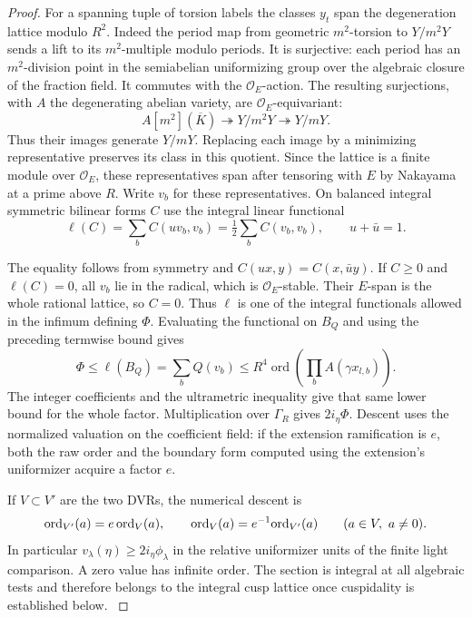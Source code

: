 \begin{proof}
For a spanning tuple of torsion labels the classes \(y_t\) span the
degeneration lattice modulo \(R^2\). Indeed the period map from
geometric \(m^2\)-torsion to \(Y/m^2Y\) sends a lift to its
\(m^2\)-multiple modulo periods. It is surjective: each period
has an \(m^2\)-division point in the semiabelian uniformizing
group over the algebraic closure of the fraction field. It
commutes with the \(\mathcal O_E\)-action. The resulting surjections, with \(A\) the degenerating abelian
variety, are \(\mathcal O_E\)-equivariant:
\[
 A[m^2](\overline K)\twoheadrightarrow Y/m^2Y\twoheadrightarrow Y/mY .
\]
Thus their images generate \(Y/mY\). Replacing each image by a minimizing
representative preserves its class in this quotient. Since the lattice is a finite module over
\(\mathcal O_E\), these representatives span after tensoring
with \(E\) by Nakayama at a prime above \(R\).
Write \(v_b\) for these representatives. On balanced integral
symmetric bilinear forms \(C\) use the integral linear functional
\[
 \ell(C)=\sum_b C(uv_b,v_b)
        =\tfrac12\sum_b C(v_b,v_b),\qquad u+\bar u=1 .
\]

The equality follows from symmetry and
\(C(ux,y)=C(x,\bar u y)\). If \(C\ge0\) and \(\ell(C)=0\),
all \(v_b\) lie in the radical, which is \(\mathcal O_E\)-stable.
Their \(E\)-span is the whole rational lattice, so \(C=0\).
Thus \(\ell\) is one of the integral functionals allowed in the
infimum defining \(\Phi\). Evaluating the functional on \(B_Q\) and using the preceding
termwise bound gives
\[
 \Phi\le\ell(B_Q)=\sum_b Q(v_b)
       \le R^4\operatorname{ord}\!\left(\prod_b A(\gamma x_{l,b})\right).
\] The integer coefficients and the
ultrametric inequality give that same lower bound for the
whole factor. Multiplication over \(\Gamma_R\) gives
\(2i_\eta\Phi\). Descent uses the normalized valuation on the
coefficient field: if the extension ramification is \(e\),
both the raw order and the boundary form computed using the
extension's uniformizer acquire a factor \(e\).

If \(V\subset V'\) are the two DVRs, the numerical descent is
\[
  {\rm ord}_{V'}(a)=e\,{\rm ord}_{V}(a),\qquad {\rm ord}_{V}(a)=e^{-1}{\rm ord}_{V'}(a)\qquad(a\in V,\ a\ne0).
\]
In particular \(v_\lambda(\eta)\ge2i_\eta\phi_\lambda\)
in the relative uniformizer units of the finite light
comparison. A zero value has infinite order. The section
is integral at all algebraic tests and therefore belongs
to the integral cusp lattice once cuspidality is established below.
\label{cor:selected-auxiliary-cusp-4}


\end{proof}
